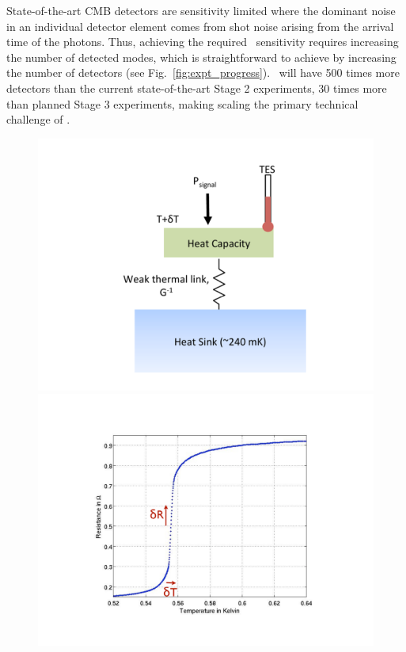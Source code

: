 State-of-the-art CMB detectors are sensitivity limited where the dominant
noise in an individual detector element comes from shot noise arising
from the arrival time of the photons. Thus, achieving the required
\cmbexp\ sensitivity requires increasing the number of detected modes,
which is straightforward to achieve by increasing the number of
detectors (see Fig.~\ref{fig:expt_progress}). \cmbexp\ will have 500
times more detectors than the current state-of-the-art Stage 2
experiments, 30 times more than planned Stage 3 experiments, making
scaling the primary technical challenge of \cmbexp.

\begin{figure}[t]
\centering
\includegraphics[trim=0.7in 0 1.5in 0,clip,scale=0.3]{Instrumentation/ThermalCircuit.pdf}
\includegraphics[trim=0.4in 0.4in 0.1 0,clip,scale=0.23]{Instrumentation/RvsT.pdf}

\end{figure}
